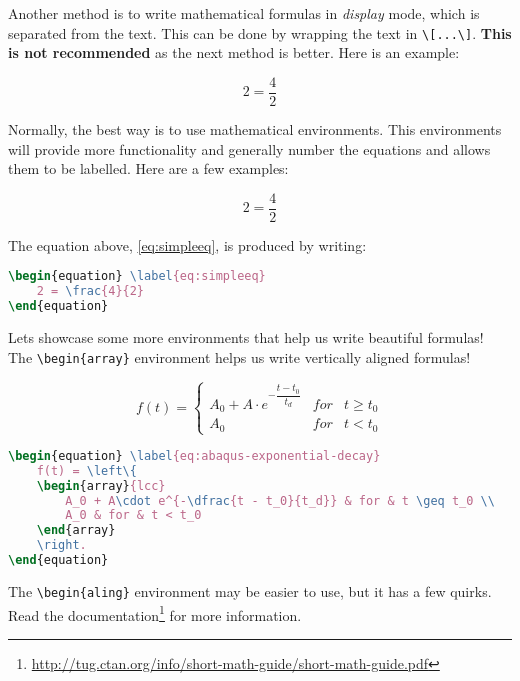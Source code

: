 Another method is to write mathematical formulas in \emph{display} mode, which is separated from the text. This can be done by wrapping the text in \verb|\[...\]|. \textbf{This is not recommended} as the next method is better. Here is an example:

\[
	2 = \frac{4}{2}
\]

Normally, the best way is to use mathematical environments. This environments will provide more functionality and generally number the equations and allows them to be labelled. Here are a few examples:

\begin{equation} \label{eq:simpleeq}
	2 = \frac{4}{2}
\end{equation}

The equation above, \cref{eq:simpleeq}, is produced by writing:

\begin{lstlisting}[language=TeX]
\begin{equation} \label{eq:simpleeq}
	2 = \frac{4}{2}
\end{equation}
\end{lstlisting}



Lets showcase some more environments that help us write beautiful formulas! The \verb|\begin{array}| environment helps us write vertically aligned formulas!

\begin{equation} \label{eq:abaqus-exponential-decay}
f(t) = \left\{
	\begin{array}{lcc}
		A_0 + A\cdot e^{-\dfrac{t - t_0}{t_d}} & for & t \geq t_0 \\
		A_0 & for & t < t_0
	\end{array}
	\right.
\end{equation}

\begin{lstlisting}[language=TeX]
\begin{equation} \label{eq:abaqus-exponential-decay}
	f(t) = \left\{
	\begin{array}{lcc}
		A_0 + A\cdot e^{-\dfrac{t - t_0}{t_d}} & for & t \geq t_0 \\
		A_0 & for & t < t_0
	\end{array}
	\right.
\end{equation}
\end{lstlisting}


The \verb|\begin{aling}| environment may be easier to use, but it has a few quirks. Read the documentation\footnote{\url{http://tug.ctan.org/info/short-math-guide/short-math-guide.pdf}} for more information.

